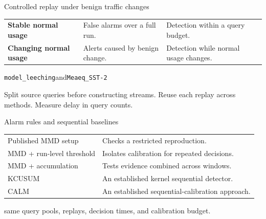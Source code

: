 \begin{frame}[t]{Controlled replay under benign traffic changes}
\vspace{0.2cm}
\renewcommand{\arraystretch}{1.5}
{\small
\begin{tabularx}{\textwidth}{@{}L{3.0cm}Y Y@{}}
\toprule
 &  & \\
\midrule
\textbf{Stable normal usage} &
False alarms over a full run. &
Detection within a query budget.\\
\textbf{Changing normal usage} &
Alerts caused by benign change. &
Detection while normal usage changes.\\
\bottomrule
\end{tabularx}\par}
\vspace{0.5cm}
\quad
{\small\texttt{model\_leeching}\quad and\quad\texttt{Meaeq\_SST-2}}\par
\vspace{0.25cm}
Split source queries before constructing streams. Reuse each replay across methods. Measure delay in query counts.
\end{frame}

\begin{frame}[t]{Alarm rules and sequential baselines}
\vspace{0.1cm}
\renewcommand{\arraystretch}{1.25}
{\small
\begin{tabularx}{\textwidth}{@{}L{4.4cm}Y@{}}
\toprule
{} & \\
\midrule
Published MMD setup &
Checks a restricted reproduction.\\
MMD + run-level threshold &
Isolates calibration for repeated decisions.\\
MMD + accumulation &
Tests evidence combined across windows.\\
KCUSUM &
An established kernel sequential detector.\\
CALM &
An established sequential-calibration approach.\\
\bottomrule
\end{tabularx}\par}
\vspace{0.35cm}
{\small{} same query pools, replays, decision times, and calibration budget.\par}
\vspace{0.15cm}
\end{frame}

